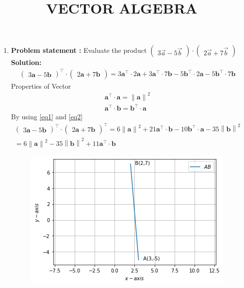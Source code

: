 \documentclass[12pt]{article}\usepackage{graphicx}
\title{\mytitle}
\newcommand{\myvec}[1]{\ensuremath{\begin{pmatrix}#1\end{pmatrix}}}
\let\vec\mathbf
\let\vec\mathbf
\providecommand{\norm}[1]{\left\lVert#1\right\rVert}
\newcommand{\solution}{\noindent \textbf{Solution: }}
\begin{document}
\begin{center}
\title{\textbf{VECTOR ALGEBRA}}
\maketitle
\end{center}
\begin{enumerate}
\item\textbf{Problem statement :} Evaluate the product $\myvec{3\overrightarrow{a}-5\overrightarrow{b}}\cdot\myvec{2\overrightarrow{a}+7\overrightarrow{b}}$
\solution
\begin{align}
    \myvec{3\vec{a}-5\vec{b}}^{\top}\cdot\myvec{2\vec{a}+7\vec{b}}= 3\vec{a}^{\top}\cdot2\vec{a}+3\vec{a}^{\top}\cdot7\vec{b}-5\vec{b}^{\top}\cdot2\vec{a}-5\vec{b}^{\top}\cdot7\vec{b}
\end{align}
Properties of Vector
\begin{align}
    \vec{a}^{\top}\cdot\vec{a} = \norm{\vec{a}}^2
    \label{eq1}  
    \\
    \vec{a}^{\top}\cdot\vec{b} = \vec{b}^{\top}\cdot\vec{a}
    \label{eq2}
\end{align}
By using \eqref{eq1} and \eqref{eq2}
\begin{align}
    \myvec{3\vec{a}-5\vec{b}}^{\top}\cdot\myvec{2\vec{a}+7\vec{b}}^{\top} = 6\norm{\vec{a}}^2 +21\vec{a}^{\top}\cdot\vec{b}-10\vec{b}^{\top}\cdot\vec{a}-35\norm{\vec{b}}^2 \\
     =6\norm{\vec{a}}^2-35\norm{\vec{b}}^2+11\vec{a}^{\top}\cdot\vec{b}
\end{align}
\begin{figure}[!h]
 \begin{center}
  \includegraphics[width=\columnwidth]{./fig.png}
 \end{center}
\caption{}
\label{fig:Fig1}
\end{figure}
\end{enumerate}
\end{document}
